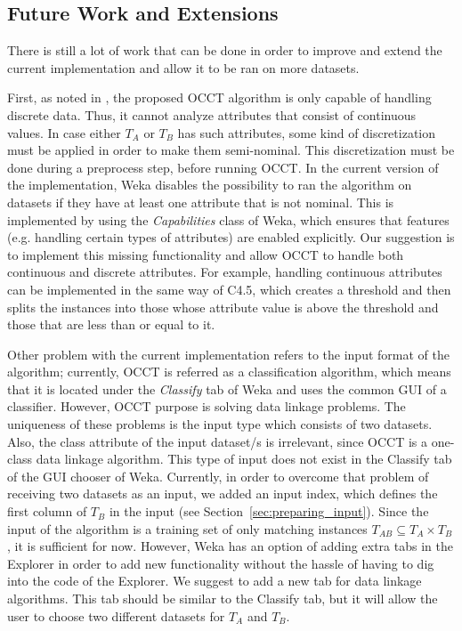 \documentclass[a4paper,12pt]{article}
\begin{document}
\begin{spacing}{1.5}
\section{Future Work and Extensions}

There is still a lot of work that can be done in order to improve and extend the current implementation and allow it to be ran on more datasets.

First, as noted in \cite{dror2011thesis}, the proposed OCCT algorithm is only capable of handling discrete data. Thus, it cannot analyze attributes that consist of continuous values. In case either $T_A$ or $T_B$ has such attributes, some kind of discretization must be applied in order to make them semi-nominal. This discretization must be done during a preprocess step, before running OCCT. In the current version of the implementation, Weka disables the possibility to ran the algorithm on datasets if they have at least one attribute that is not nominal. This is implemented by using the {\em Capabilities} class of Weka, which ensures that features (e.g. handling certain types of attributes) are enabled explicitly. Our suggestion is to implement this missing functionality and allow OCCT to handle both continuous and discrete attributes. For example, handling continuous attributes can be implemented in the same way of C4.5, which creates a threshold and then splits the instances into those whose attribute value is above the threshold and those that are less than or equal to it.

Other problem with the current implementation refers to the input format of the algorithm; currently, OCCT is referred as a classification algorithm, which means that it is located under the {\em Classify} tab of Weka and uses the common GUI of a classifier. However, OCCT purpose is solving data linkage problems. The uniqueness of these problems is the input type which consists of two datasets. Also, the class attribute of the input dataset/s is irrelevant, since OCCT is a one-class data linkage algorithm. This type of input does not exist in the Classify tab of the GUI chooser of Weka. Currently, in order to overcome that problem of receiving two datasets as an input, we added an input index, which defines the first column of $T_B$ in the input (see Section~\ref{sec:preparing_input}). Since the input of the algorithm is a training set of only matching instances $T_{AB} \subseteq T_A \times T_B$, it is sufficient for now. However, Weka has an option of adding extra tabs in the Explorer in order to add new functionality without the hassle of having to dig into the code of the Explorer. We suggest to add a new tab for data linkage algorithms. This tab should be similar to the Classify tab, but it will allow the user to choose two different datasets for $T_A$ and $T_B$.



\end{spacing}
\end{document}
